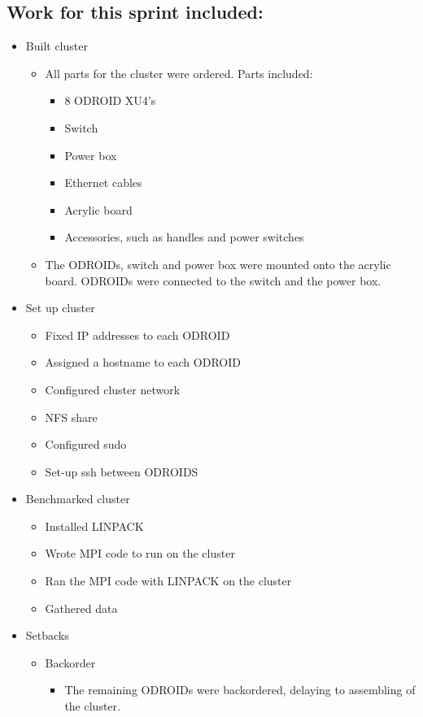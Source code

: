 \documentclass{article}
\begin{document}
\subsection*{Work for this sprint included:}
\begin{itemize}
	\item Built cluster
	\begin{itemize}
		\item All parts for the cluster were ordered. Parts included:
		\begin{itemize}
			\item 8 ODROID XU4's
			\item Switch
			\item Power box
			\item Ethernet cables
			\item Acrylic board
			\item Accessories, such as handles and power switches
		\end{itemize}
		\item The ODROIDs, switch and power box were mounted onto the acrylic board. ODROIDs were connected to the switch and the power box.
	\end{itemize}
	\item Set up cluster
	\begin{itemize}
		\item Fixed IP addresses to each ODROID
		\item Assigned a hostname to each ODROID
		\item Configured cluster network
		\item NFS share
		\item Configured sudo
		\item Set-up ssh between ODROIDS
	\end{itemize}
	\item Benchmarked cluster
	\begin{itemize}
		\item Installed LINPACK
		\item Wrote MPI code to run on the cluster
		\item Ran the MPI code with LINPACK on the cluster
		\item Gathered data
	\end{itemize}
	\item Setbacks
	\begin{itemize}
		\item Backorder
		\begin{itemize}
			\item The remaining ODROIDs were backordered, delaying to assembling of the cluster.

\end{itemize}
\end{itemize}
\end{itemize}
\end{document}
